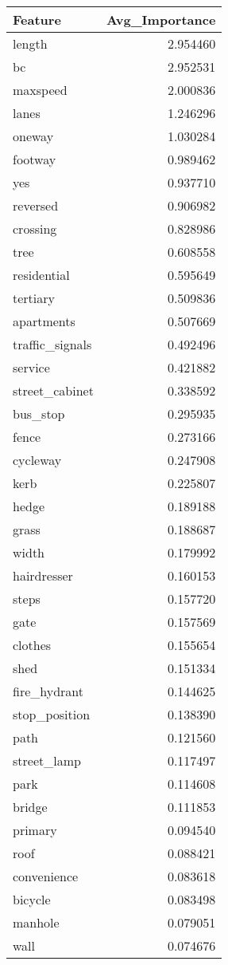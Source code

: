 \begin{tabular}{lr}
\toprule
Feature & Avg_Importance \\
\midrule
length & 2.954460 \\
bc & 2.952531 \\
maxspeed & 2.000836 \\
lanes & 1.246296 \\
oneway & 1.030284 \\
footway & 0.989462 \\
yes & 0.937710 \\
reversed & 0.906982 \\
crossing & 0.828986 \\
tree & 0.608558 \\
residential & 0.595649 \\
tertiary & 0.509836 \\
apartments & 0.507669 \\
traffic_signals & 0.492496 \\
service & 0.421882 \\
street_cabinet & 0.338592 \\
bus_stop & 0.295935 \\
fence & 0.273166 \\
cycleway & 0.247908 \\
kerb & 0.225807 \\
hedge & 0.189188 \\
grass & 0.188687 \\
width & 0.179992 \\
hairdresser & 0.160153 \\
steps & 0.157720 \\
gate & 0.157569 \\
clothes & 0.155654 \\
shed & 0.151334 \\
fire_hydrant & 0.144625 \\
stop_position & 0.138390 \\
path & 0.121560 \\
street_lamp & 0.117497 \\
park & 0.114608 \\
bridge & 0.111853 \\
primary & 0.094540 \\
roof & 0.088421 \\
convenience & 0.083618 \\
bicycle & 0.083498 \\
manhole & 0.079051 \\
wall & 0.074676 \\

\end{tabular}

